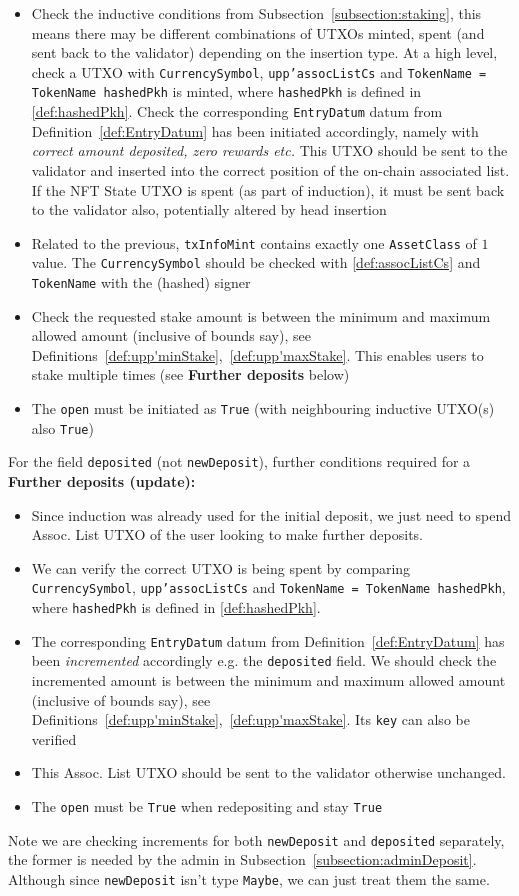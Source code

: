\documentclass[10pt, a4paper]{article}
\theoremstyle{definition}
\begin{document}
\begin{itemize}
\item{Check the inductive conditions from Subsection~\ref{subsection:staking}, this means there may be different combinations of UTXOs minted, spent (and sent back to the validator) depending on the insertion type. At a high level, check a UTXO with \texttt{CurrencySymbol}, \texttt{upp'assocListCs} and \texttt{TokenName = TokenName hashedPkh} is minted, where \texttt{hashedPkh} is defined in \ref{def:hashedPkh}. Check the corresponding \texttt{EntryDatum} datum from Definition~\ref{def:EntryDatum} has been initiated accordingly, namely with \textit{correct amount deposited, zero rewards etc.} This UTXO should be sent to the validator and inserted into the correct position of the on-chain associated list. If the NFT State UTXO is spent (as part of induction), it must be sent back to the validator also, potentially altered by head insertion}
\item{Related to the previous, \texttt{txInfoMint} contains exactly one \texttt{AssetClass} of $1$ value. The \texttt{CurrencySymbol} should be checked with \ref{def:assocListCs} and \texttt{TokenName} with the (hashed) signer}
\item{Check the requested stake amount is between the minimum and maximum allowed amount (inclusive of bounds say), see Definitions~\ref{def:upp'minStake},~\ref{def:upp'maxStake}. This enables users to stake multiple times (see \textbf{Further deposits} below)}
\item{The \texttt{open} must be initiated as \texttt{True} (with neighbouring inductive UTXO(s) also \texttt{True})}
\end{itemize}
For the field \texttt{deposited} (not \texttt{newDeposit}), further conditions required for a \textbf{Further deposits (update):}
\begin{itemize}
\item{Since induction was already used for the initial deposit, we just need to spend Assoc. List UTXO of the user looking to make further deposits.}
\item{We can verify the correct UTXO is being spent by comparing \texttt{CurrencySymbol}, \texttt{upp'assocListCs} and \texttt{TokenName = TokenName hashedPkh}, where \texttt{hashedPkh} is defined in \ref{def:hashedPkh}.}
\item{The corresponding \texttt{EntryDatum} datum from Definition~\ref{def:EntryDatum} has been \textit{incremented} accordingly e.g. the \texttt{deposited} field. We should check the incremented amount is between the minimum and maximum allowed amount (inclusive of bounds say), see Definitions~\ref{def:upp'minStake},~\ref{def:upp'maxStake}.  Its \texttt{key} can also be verified} 
\item{This Assoc. List UTXO should be sent to the validator otherwise unchanged.}
\item{The \texttt{open} must be \texttt{True} when redepositing and stay \texttt{True}}
\end{itemize}
Note we are checking increments for both \texttt{newDeposit} and \texttt{deposited} separately, the former is needed by the admin in Subsection~\ref{subsection:adminDeposit}. Although since \texttt{newDeposit} isn't type \texttt{Maybe}, we can just treat them the same.
\end{document}
